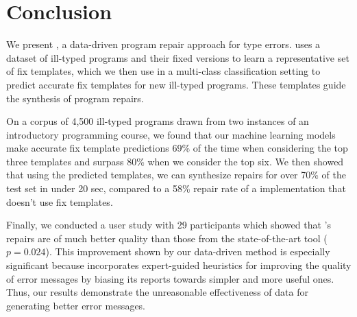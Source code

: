 \section{Conclusion}
\label{sec:conclusion}

We present \toolname, a data-driven program repair approach for
type errors. \toolname uses a dataset of ill-typed
programs and their fixed versions to learn a representative set of fix
templates, which we then use in a multi-class classification setting
to predict accurate fix templates for new ill-typed programs. These templates
guide the synthesis of program repairs.

On a corpus of 4,500 ill-typed \ocaml programs drawn from two instances of an
introductory programming course, we found that our machine learning models make
accurate fix template predictions 69\% of the time when considering the top
three templates and surpass 80\% when we consider the top six. We then showed
that using the predicted templates, we can synthesize repairs for over 70\% of
the test set in under 20 sec, compared to a 58\% repair rate of a \naive
implementation that doesn't use fix templates.

Finally, we conducted a user study with 29 participants which showed
that \toolname's repairs are of much better
quality than those from the state-of-the-art tool \seminal ($p=0.024$).
This improvement
shown by our data-driven method is especially significant because \seminal
incorporates expert-guided heuristics for improving the quality of error
messages by biasing its reports towards simpler and more useful ones. Thus, our
results demonstrate the unreasonable effectiveness of data for generating better
error messages.
